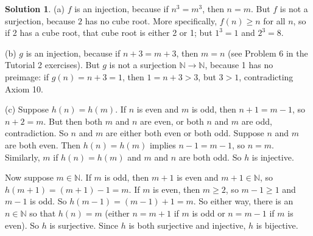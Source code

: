 \documentclass{article}
\numberwithin{equation}{section}
\theoremstyle{plain}
\theoremstyle{definition}
\newtheorem*{solution*}{Solution}
\newcommand{\N}{\mathbb N}
\begin{document}
\begin{solution*}
	(a) $f$ is an injection, because if $n^3 = m^3$, then $n = m$. But $f$ is not a surjection, because $2$ has no cube root. More specifically, $f(n) \geq n$ for all $n$, so if 2 has a cube root, that cube root is either 2 or 1; but $1^3 = 1$ and $2^3 = 8$. 
	
	(b) $g$ is an injection, because if $n+3 = m+3$, then $m=n$ (see Problem 6 in the Tutorial 2 exercises). But $g$ is not a surjection $\N\to\N$, because 1 has no preimage: if $g(n) = n+3 = 1$, then $1 = n+3 > 3$, but $3 > 1$, contradicting Axiom 10. 
	
	(c) Suppose $h(n) = h(m)$. If $n$ is even and $m$ is odd, then $n+1 = m-1$, so $n+2 = m$. But then both $m$ and $n$ are even, or both $n$ and $m$ are odd, contradiction. So $n$ and $m$ are either both even or both odd. Suppose $n$ and $m$ are both even. Then $h(n) = h(m)$ implies $n-1 = m-1$, so $n = m$. Similarly, $m$ if $h(n) = h(m)$ and $m$ and $n$ are both odd. So $h$ is injective. 
	
	Now suppose $m \in \N$. If $m$ is odd, then $m + 1$ is even and $m+1 \in \N$, so $h(m+1) = (m+1) - 1 = m$. If $m$ is even, then $m \geq 2$, so $m-1 \geq 1$ and $m-1$ is odd. So $h(m-1) = (m-1)+1 = m$. So either way, there is an $n \in \N$ so that $h(n) = m$ (either $n = m+1$ if $m$ is odd or $n = m-1$ if $m$ is even). So $h$ is surjective. Since $h$ is both surjective and injective, $h$ is bijective. 
\end{solution*}
\end{document}
